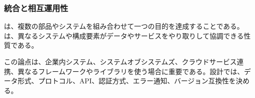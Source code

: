 \subsubsection{統合と相互運用性}

 は、複数の部品やシステムを組み合わせて一つの目的を達成することである。 は、異なるシステムや構成要素がデータやサービスをやり取りして協調できる性質である。

この論点は、企業内システム、システムオブシステムズ、クラウドサービス連携、異なるフレームワークやライブラリを使う場合に重要である。設計では、データ形式、プロトコル、API、認証方式、エラー通知、バージョン互換性を決める。
